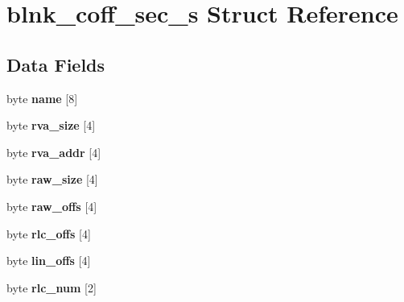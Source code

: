 \hypertarget{structblnk__coff__sec__s}{\section{blnk\-\_\-coff\-\_\-sec\-\_\-s Struct Reference}
\label{structblnk__coff__sec__s}
}
\subsection*{Data Fields}
\begin{DoxyCompactItemize}
\item 
\hypertarget{structblnk__coff__sec__s_afb799c9b4fb00e537427743538e06a0f}{byte {\bfseries name} \mbox{[}8\mbox{]}}\label{structblnk__coff__sec__s_afb799c9b4fb00e537427743538e06a0f}

\item 
\hypertarget{structblnk__coff__sec__s_af6e2b6c413a18cad8f63f411f9ff7dae}{byte {\bfseries rva\-\_\-size} \mbox{[}4\mbox{]}}\label{structblnk__coff__sec__s_af6e2b6c413a18cad8f63f411f9ff7dae}

\item 
\hypertarget{structblnk__coff__sec__s_a2f086c17e54ec29c7af00e90e80ae491}{byte {\bfseries rva\-\_\-addr} \mbox{[}4\mbox{]}}\label{structblnk__coff__sec__s_a2f086c17e54ec29c7af00e90e80ae491}

\item 
\hypertarget{structblnk__coff__sec__s_afee59688635b09ea7c049b3b17d3a7de}{byte {\bfseries raw\-\_\-size} \mbox{[}4\mbox{]}}\label{structblnk__coff__sec__s_afee59688635b09ea7c049b3b17d3a7de}

\item 
\hypertarget{structblnk__coff__sec__s_ab1fc6c88f9412531684993b517de9215}{byte {\bfseries raw\-\_\-offs} \mbox{[}4\mbox{]}}\label{structblnk__coff__sec__s_ab1fc6c88f9412531684993b517de9215}

\item 
\hypertarget{structblnk__coff__sec__s_a8bed1a41038ddc2a3eddda555443f785}{byte {\bfseries rlc\-\_\-offs} \mbox{[}4\mbox{]}}\label{structblnk__coff__sec__s_a8bed1a41038ddc2a3eddda555443f785}

\item 
\hypertarget{structblnk__coff__sec__s_a715b4e869fda0c617a0b5ee38564dc43}{byte {\bfseries lin\-\_\-offs} \mbox{[}4\mbox{]}}\label{structblnk__coff__sec__s_a715b4e869fda0c617a0b5ee38564dc43}

\item 
\hypertarget{structblnk__coff__sec__s_ab4a9465d78816b8d4ab37ed8daf5735c}{byte {\bfseries rlc\-\_\-num} \mbox{[}2\mbox{]}}\label{structblnk__coff__sec__s_ab4a9465d78816b8d4ab37ed8daf5735c}


\end{DoxyCompactItemize}
